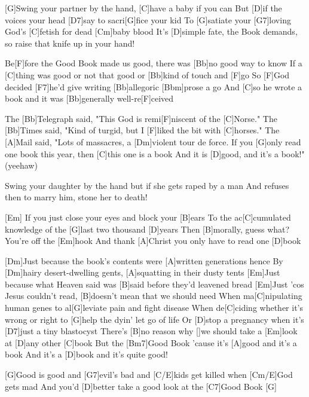 \begin{guitar}
	\begin{slimhighlightbar}
		[G]Swing your partner by the hand, [C]have a baby if you can
		But [D]if the voices your head [D7]say to sacri[G]fice your kid
		To [G]satiate your [G7]loving God's [C]fetish for dead [Cm]baby blood
		It's [D]simple fate, the Book demands, so raise that knife up in your hand!
	\end{slimhighlightbar}
	
	\songsection{Verse 4}
	Be[F]fore the Good Book made us good, there was [Bb]no good way to know
	If a [C]thing was good or not that good or [Bb]kind of touch and [F]go
	So [F]God decided [F7]he'd give writing [Bb]allegoric [Bbm]prose a go
	And [C]so he wrote a book and it was [Bb]generally well-re[F]ceived
	
	\songsection{Reviews}
	The [Bb]Telegraph said, "This God is remi[F]niscent of the [C]Norse."
	The [Bb]Times said, "Kind of turgid, but I [F]liked the bit with [C]horses."
	The [A]Mail said, "Lots of massacres, a [Dm]violent tour de force.
	If you [G]only read one book this year, then [C]this one is a book
	And it is [D]good, and it's a book!" (yeehaw)
	
	\begin{slimhighlightbar}
		\songsection{Interlude 2}
		Swing your daughter by the hand but if she gets raped by a man
		And refuses then to marry him, stone her to death!
	\end{slimhighlightbar}
	
	[Em] If you just close your eyes and block your [B]ears
	To the ac[C]cumulated knowledge of the [G]last two thousand [D]years
	Then [B]morally, guess what? You're off the [Em]hook
	And thank [A]Christ you only have to read one [D]book
	
	[Dm]Just because the book's contents were [A]written generations hence
	By [Dm]hairy desert-dwelling gents, [A]squatting in their dusty tents
	[Em]Just because what Heaven said was [B]said before they'd leavened bread
	[Em]Just 'cos Jesus couldn't read, [B]doesn't mean that we should need
	When ma[C]nipulating human genes to al[G]leviate pain and fight disease
	When de[C]ciding whether it's wrong or right to [G]help the dyin' let go of life
	Or [D]stop a pregnancy when it's [D7]just a tiny blastocyst
	There's [B]no reason why []we should take a [Em]look at [D]any other [C]book 
	But the [Bm7]Good Book 'cause it's [A]good and it's a book 
	And it's a [D]book and it's quite good!
	
	[G]Good is good and [G7]evil's bad and [C/E]kids get killed when [Cm/E]God gets mad
	And you'd [D]better take a good look at the [C7]Good Book [G]{}
\end{guitar}